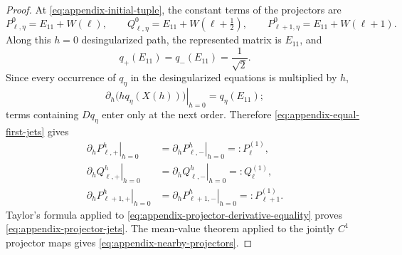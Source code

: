 \documentclass[10pt,a4paper]{amsart}
\numberwithin{equation}{section}
\begin{document}
\begin{proof}
At \eqref{eq:appendix-initial-tuple}, the constant terms of the
projectors are
\[
 P^0_{\ell,\eta}=E_{11}+W(\ell),
 \qquad
 Q^0_{\ell,\eta}=E_{11}+W(\ell+\tfrac12),
 \qquad
 P^0_{\ell+1,\eta}=E_{11}+W(\ell+1).
\]
Along this $h=0$ desingularized path, the represented matrix is
\(E_{11}\), and
\begin{equation}\label{eq:appendix-equal-first-jets}
 q_+(E_{11})=q_-(E_{11})=\frac1{\sqrt2}.
\end{equation}
Since every occurrence of \(q_\eta\) in the desingularized equations
is multiplied by \(h\),
\[
 \left.\partial_h\bigl(hq_\eta(X(h))\bigr)\right|_{h=0}
 =q_\eta(E_{11});
\]
terms containing $Dq_\eta$ enter only at the next order.  Therefore
\eqref{eq:appendix-equal-first-jets} gives
\begin{equation}\label{eq:appendix-projector-derivative-equality}
\begin{aligned}
 \left.\partial_hP^h_{\ell,+}\right|_{h=0}
 &=\left.\partial_hP^h_{\ell,-}\right|_{h=0}
 =:P^{(1)}_\ell,\\
 \left.\partial_hQ^h_{\ell,+}\right|_{h=0}
 &=\left.\partial_hQ^h_{\ell,-}\right|_{h=0}
 =:Q^{(1)}_\ell,\\
 \left.\partial_hP^h_{\ell+1,+}\right|_{h=0}
 &=\left.\partial_hP^h_{\ell+1,-}\right|_{h=0}
 =:P^{(1)}_{\ell+1}.
\end{aligned}
\end{equation}
Taylor's formula applied to
\eqref{eq:appendix-projector-derivative-equality} proves
\eqref{eq:appendix-projector-jets}.  The mean-value theorem applied to
the jointly \(C^1\) projector maps gives
\eqref{eq:appendix-nearby-projectors}.
\end{proof}



\end{document}
